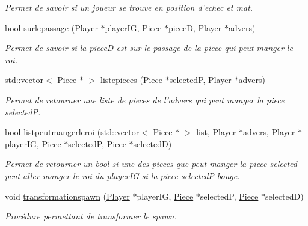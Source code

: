 \begin{DoxyCompactItemize}
\begin{DoxyCompactList}\small\item\em Permet de savoir si un joueur se trouve en position d'echec et mat. \end{DoxyCompactList}\item 
bool \hyperlink{class_chess_aa4a6555edfbb4ec3d81f5feea272c889}{surlepassage} (\hyperlink{class_player}{Player} $\ast$player\-I\-G, \hyperlink{class_piece}{Piece} $\ast$piece\-D, \hyperlink{class_player}{Player} $\ast$advers)
\begin{DoxyCompactList}\small\item\em Permet de savoir si la piece\-D est sur le passage de la piece qui peut manger le roi. \end{DoxyCompactList}\item 
std\-::vector$<$ \hyperlink{class_piece}{Piece} $\ast$ $>$ \hyperlink{class_chess_ab1077aa8c0d1d6849788b2548c2e71ad}{listepieces} (\hyperlink{class_piece}{Piece} $\ast$selected\-P, \hyperlink{class_player}{Player} $\ast$advers)
\begin{DoxyCompactList}\small\item\em Permet de retourner une liste de pieces de l'advers qui peut manger la piece selected\-P. \end{DoxyCompactList}\item 
bool \hyperlink{class_chess_ae4012cc01ef4914e17c756c0adcfee14}{listpeutmangerleroi} (std\-::vector$<$ \hyperlink{class_piece}{Piece} $\ast$ $>$ list, \hyperlink{class_player}{Player} $\ast$advers, \hyperlink{class_player}{Player} $\ast$player\-I\-G, \hyperlink{class_piece}{Piece} $\ast$selected\-P, \hyperlink{class_piece}{Piece} $\ast$selected\-D)
\begin{DoxyCompactList}\small\item\em Permet de retourner un bool si une des pieces que peut manger la piece selected peut aller manger le roi du player\-I\-G si la piece selected\-P bouge. \end{DoxyCompactList}\item 
void \hyperlink{class_chess_a28adecf1d95d52e735ae592222bd2618}{transformationspawn} (\hyperlink{class_player}{Player} $\ast$player\-I\-G, \hyperlink{class_piece}{Piece} $\ast$selected\-P, \hyperlink{class_piece}{Piece} $\ast$selected\-D)
\begin{DoxyCompactList}\small\item\em Procédure permettant de transformer le spawn. \end{DoxyCompactList}\item 

\end{DoxyCompactItemize}
